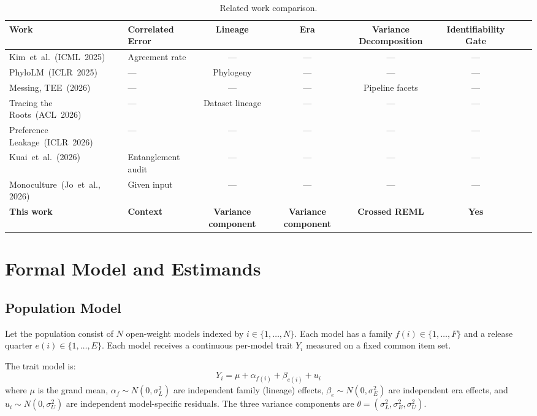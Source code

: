 \documentclass[journal]{IEEEtran}
\begin{document}
\begin{table}[!t]
\centering
\caption{Related work comparison.}
\label{tab:related}
\begin{tabular}{llcccccc}
\toprule
Work & Correlated Error & Lineage & Era & Variance Decomposition & Identifiability Gate \\
\midrule
Kim~et~al.~(ICML~2025) & Agreement rate & --- & --- & --- & --- \\
PhyloLM~(ICLR~2025) & --- & Phylogeny & --- & --- & --- \\
Messing, TEE~(2026) & --- & --- & --- & Pipeline facets & --- \\
Tracing the Roots~(ACL~2026) & --- & Dataset lineage & --- & --- & --- \\
Preference Leakage~(ICLR~2026) & --- & --- & --- & --- & --- \\
Kuai~et~al.~(2026) & Entanglement audit & --- & --- & --- & --- \\
Monoculture~(Jo~et~al., 2026) & Given input & --- & --- & --- & --- \\
\textbf{This work} & \textbf{Context} & \textbf{Variance component} & \textbf{Variance component} & \textbf{Crossed REML} & \textbf{Yes} \\
\bottomrule
\end{tabular}
\end{table}

\section{Formal Model and Estimands}

\subsection{Population Model}

Let the population consist of $N$ open-weight models indexed by $i \in \{1, \ldots, N\}$. Each model has a family $f(i) \in \{1, \ldots, F\}$ and a release quarter $e(i) \in \{1, \ldots, E\}$. Each model receives a continuous per-model trait $Y_i$ measured on a fixed common item set.

The trait model is:
\begin{equation}
Y_i = \mu + \alpha_{f(i)} + \beta_{e(i)} + u_i
\label{eq:trait}
\end{equation}
where $\mu$ is the grand mean, $\alpha_f \sim N(0, \sigma^2_L)$ are independent family (lineage) effects, $\beta_e \sim N(0, \sigma^2_E)$ are independent era effects, and $u_i \sim N(0, \sigma^2_U)$ are independent model-specific residuals. The three variance components are $\theta = (\sigma^2_L, \sigma^2_E, \sigma^2_U)$.
\end{document}
